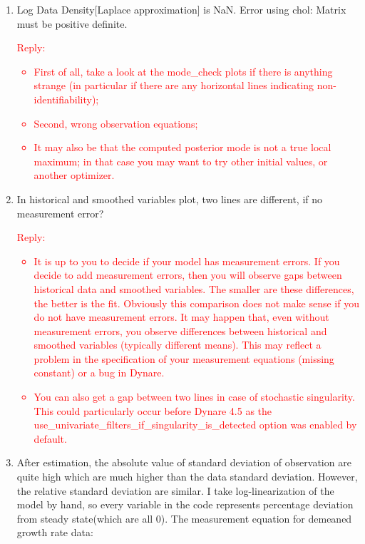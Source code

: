 \documentclass[cn,10pt,math=newtx,citestyle=gb7714-2015,bibstyle=gb7714-2015]{elegantbook}
\begin{document}
{{\begin{enumerate}
{\begin{itemize}
				\item Check prior shape (e.g. Inf density at bounds);
				\item Increase the informativeness of the prior.
			\end{itemize}
		}
		\item Log Data Density[Laplace approximation] is NaN. Error using chol: Matrix must be positive definite.\\
		\textcolor{red}{Reply:
			\begin{itemize}
				\item First of all, take a look at the mode\_check plots if there is anything strange (in particular if there are any horizontal lines indicating non-identifiability);
				\item Second, wrong observation equations;
				\item It may also be that the computed posterior mode is not a true local maximum; in that case you may want to try other initial values, or another optimizer.
			\end{itemize}
		}
		\item In historical and smoothed variables plot, two lines are different, if no measurement error?\\
		\textcolor{red}{Reply:
			\begin{itemize}
				\item It is up to you to decide if your model has measurement errors. If you decide to add measurement errors, then you will observe gaps between historical data and smoothed variables. The smaller are these differences, the better is the fit. Obviously this comparison does not make sense if you do not have measurement errors. It may happen that, even without measurement errors, you observe differences between historical and smoothed variables (typically different means). This may reflect a problem in the specification of your measurement equations (missing constant) or a bug in Dynare.
				\item You can also get a gap between two lines in case of stochastic singularity. This could particularly occur before Dynare 4.5 as the use\_univariate\_filters\_if\_singularity\_is\_detected option was enabled by default.
		\end{itemize}}
		\item After estimation, the absolute value of standard deviation of observation are quite high which are much higher than the data standard deviation. However, the relative standard deviation are similar. I take log-linearization of the model by hand, so every variable in the code represents percentage deviation from steady state(which are all 0). The measurement equation for demeaned growth rate data:

\end{enumerate}}}
\end{document}
